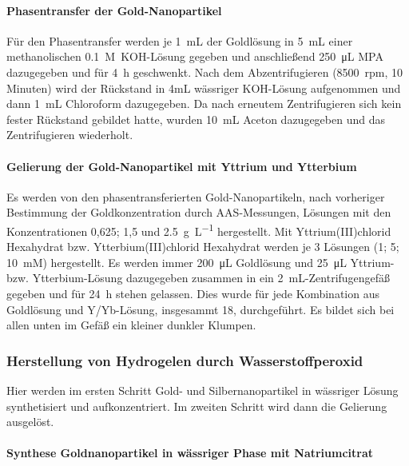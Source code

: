 			\paragraph{Phasentransfer der Gold-Nanopartikel}
		
			Für den Phasentransfer werden je \SI{1}{\milli\liter} der Goldlösung in \SI{5}{\milli\liter} einer methanolischen \SI{0,1}{M}~KOH-Lösung gegeben und anschließend \SI{250}{\micro\liter} MPA dazugegeben und für \SI{4}{\hour} geschwenkt.
			Nach dem Abzentrifugieren (8500~rpm, 10 Minuten) wird der Rückstand in 4mL wässriger KOH-Lösung aufgenommen und dann \SI{1}{\milli\liter} Chloroform dazugegeben. 
			Da nach erneutem Zentrifugieren sich kein fester Rückstand gebildet hatte, wurden \SI{10}{\milli\liter} Aceton dazugegeben und das Zentrifugieren wiederholt.
				
			\paragraph{Gelierung der Gold-Nanopartikel mit Yttrium und Ytterbium}
				
			Es werden von den phasentransferierten Gold-Nanopartikeln, nach vorheriger Bestimmung der Goldkonzentration durch AAS-Messungen, Lösungen mit den Konzentrationen 0,625; 1,5 und \SI{2,5}{\gram\per\liter} hergestellt.
			Mit Yttrium(III)chlorid Hexahydrat bzw. Ytterbium(III)chlorid Hexahydrat werden je 3 Lösungen (1; 5; \SI{10}{mM}) hergestellt.
			Es werden immer \SI{200}{\micro\liter} Goldlösung und \SI{25}{\micro\liter} Yttrium- bzw. Ytterbium-Lösung dazugegeben zusammen in ein \SI{2}{\milli\liter}-Zentrifugengefäß gegeben und für \SI{24}{\hour} stehen gelassen.
			Dies wurde für jede Kombination aus Goldlösung und Y/Yb-Lösung, insgesammt 18, durchgeführt.
			Es bildet sich bei allen unten im Gefäß ein kleiner dunkler Klumpen.
			  
		\subsubsection{Herstellung von Hydrogelen durch Wasserstoffperoxid}
			Hier werden im ersten Schritt Gold- und Silbernanopartikel in wässriger Lösung synthetisiert und aufkonzentriert.
			Im zweiten Schritt wird dann die Gelierung ausgelöst. \autocite{Bigall2009} 
		 
			\paragraph{Synthese Goldnanopartikel in wässriger Phase mit Natriumcitrat}
			
